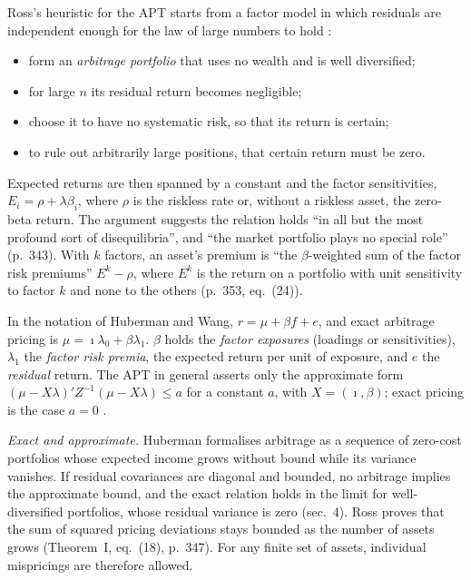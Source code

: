 \begin{qfmodel}\label{mod:multifactor-apt}
 Ross's heuristic for the APT starts from a factor model in which residuals are independent enough for the law of large numbers to hold \citep[\emph{Journal of Economic Theory} 13, 1976, pp.~342--343]{arbitrage-theory-1976}:
\begin{itemize}
\item form an \emph{arbitrage portfolio} that uses no wealth and is well diversified;
\item for large $n$ its residual return becomes negligible;
\item choose it to have no systematic risk, so that its return is certain;
\item to rule out arbitrarily large positions, that certain return must be zero.
\end{itemize}
Expected returns are then spanned by a constant and the factor sensitivities, $E_i=\rho+\lambda\beta_i$, where $\rho$ is the riskless rate or, without a riskless asset, the zero-beta return. The argument suggests the relation holds ``in all but the most profound sort of disequilibria'', and ``the market portfolio plays no special role'' (p.~343). With $k$ factors, an asset's premium is ``the $\beta$-weighted sum of the factor risk premiums'' $E^k-\rho$, where $E^k$ is the return on a portfolio with unit sensitivity to factor $k$ and none to the others (p.~353, eq.~(24)).

 In the notation of Huberman and Wang, $r=\mu+\beta f+e$, and exact arbitrage pricing is $\mu=\imath\lambda_0+\beta\lambda_1$. $\beta$ holds the \emph{factor exposures} (loadings or sensitivities), $\lambda_1$ the \emph{factor risk premia}, the expected return per unit of exposure, and $e$ the \emph{residual} return. The APT in general asserts only the approximate form $(\mu-X\lambda)'Z^{-1}(\mu-X\lambda)\le a$ for a constant $a$, with $X=(\imath,\beta)$; exact pricing is the case $a=0$ \citep[FRBNY Staff Report 216, August 2005, sec.~2, eqs.~(1)--(3)]{arbitrage-pricing-review-2005}.

 \emph{Exact and approximate.} Huberman formalises arbitrage as a sequence of zero-cost portfolios whose expected income grows without bound while its variance vanishes. If residual covariances are diagonal and bounded, no arbitrage implies the approximate bound, and the exact relation holds in the limit for well-diversified portfolios, whose residual variance is zero (sec.~4). Ross proves that the sum of squared pricing deviations stays bounded as the number of assets grows (Theorem~I, eq.~(18), p.~347). For any finite set of assets, individual mispricings are therefore allowed.


\end{qfmodel}
